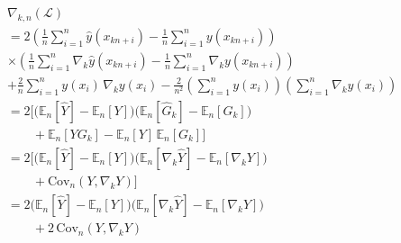 \begin{equation}
\begin{split}
    &\nabla_{k,n}(\mathcal{L}) \\
&= 2\left(
      \frac{1}{n}\sum_{i=1}^{n}\hat{y}(x_{kn+i})
      - \frac{1}{n}\sum_{i=1}^{n}y(x_{kn+i})
   \right) \\
   & 
   \times \left(
      \frac{1}{n}\sum_{i=1}^{n}\nabla_k \hat{y}(x_{kn+i})
      - \frac{1}{n}\sum_{i=1}^{n}\nabla_k y(x_{kn+i})
   \right) \nonumber\\ %
&
   + \frac{2}{n}\sum_{i=1}^{n} y(x_i)\,\nabla_k y(x_i)
   - \frac{2}{n^2}
     \left( \sum_{i=1}^{n} y(x_i) \right)
     \left( \sum_{i=1}^{n} \nabla_k y(x_i) \right) \\
&= 2\Big[
      \big( \mathbb{E}_n[\hat{Y}] - \mathbb{E}_n[Y] \big)
      \big( \mathbb{E}_n[\hat{G}_k] - \mathbb{E}_n[G_k] \big) \\
      & \quad \quad 
      + \mathbb{E}_n[Y G_k]
      - \mathbb{E}_n[Y]\,\mathbb{E}_n[G_k]
   \Big] \\ 
& = 2\Big[
      \big( \mathbb{E}_n[\hat{Y}] - \mathbb{E}_n[Y] \big)
      \big( \mathbb{E}_n[\nabla_k \hat{Y}] - \mathbb{E}_n[\nabla_k Y] \big)\\
& \quad \quad + \mathrm{Cov}_n(Y,\nabla_k Y) \Big] \\ 
& = 2 \big( \mathbb{E}_n[\hat{Y}] - \mathbb{E}_n[Y] \big) \big( \mathbb{E}_n[\nabla_k \hat{Y}] - \mathbb{E}_n[\nabla_k Y] \big) \\
& \quad \quad + 2\,\mathrm{Cov}_n(Y,\nabla_k Y)
\end{split}
\end{equation}

